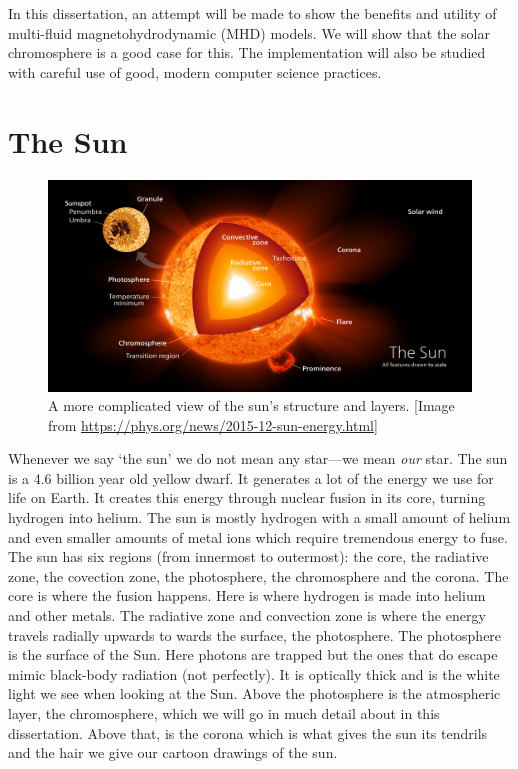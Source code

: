 \documentclass[12pt,upcase]{umlthesis}
\begin{document}
In this dissertation, an attempt will be made to show the benefits and utility of multi-fluid magnetohydrodynamic (MHD) models. We will show that the solar chromosphere is a good case for this. The implementation will also be studied with careful use of good, modern computer science practices.

\section{The Sun}
\begin{figure}[h!]\label{fig:sunstructure}
	\centering
	\includegraphics[width=1.0\linewidth]{sunstructure.png}
	\caption{A more complicated view of the sun's structure and layers. [{Image from \url{https://phys.org/news/2015-12-sun-energy.html}}]} %
\end{figure}
Whenever we say `the sun' we do not mean any star---we mean \textit{our} star. The sun is a 4.6 billion year old yellow dwarf. It generates a lot of the energy we use for life on Earth. It creates this energy through nuclear fusion in its core, turning hydrogen into helium. The sun is mostly hydrogen with a small amount of helium and even smaller amounts of metal ions which require tremendous energy to fuse. The sun has six regions (from innermost to outermost): the core, the radiative zone, the covection zone, the photosphere, the chromosphere and the corona. The core is where the fusion happens. Here is where hydrogen is made into helium and other metals. The radiative zone and convection zone is where the energy travels radially upwards to wards the surface, the photosphere. The photosphere is the surface of the Sun. Here photons are trapped but the ones that do escape mimic black-body radiation (not perfectly). It is optically thick and is the white light we see when looking at the Sun. Above the photosphere is the atmospheric layer, the chromosphere, which we will go in much detail about in this dissertation. Above that, is the corona which is what gives the sun its tendrils and the hair we give our cartoon drawings of the sun.
\end{document}
